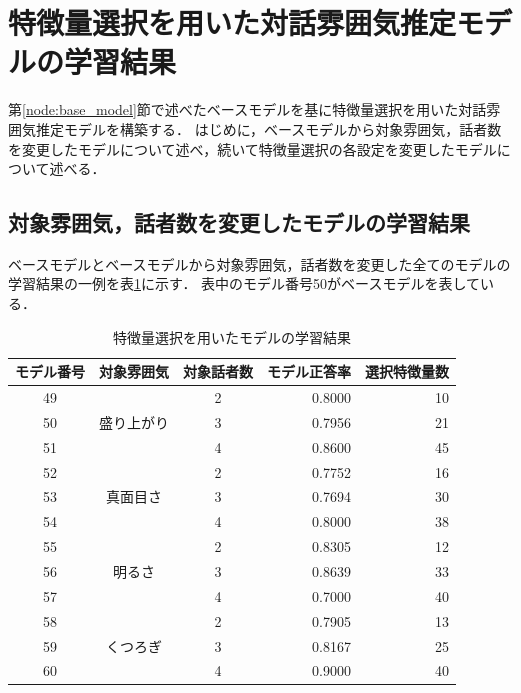 \section{特徴量選択を用いた対話雰囲気推定モデルの学習結果\label{node:learning_result_with_ga}}

第\ref{node:base_model}節で述べたベースモデルを基に特徴量選択を用いた対話雰囲気推定モデルを構築する．
はじめに，ベースモデルから対象雰囲気，話者数を変更したモデルについて述べ，続いて特徴量選択の各設定を変更したモデルについて述べる．

\subsection{対象雰囲気，話者数を変更したモデルの学習結果\label{item:learning_result_with_ga_change_targets}}

ベースモデルとベースモデルから対象雰囲気，話者数を変更した全てのモデルの学習結果の一例を表\ref{tab:learn_result_with_ga}に示す．
表中のモデル番号50がベースモデルを表している．

\begin{table}[t]
    \caption{特徴量選択を用いたモデルの学習結果}
    \centering
    \begin{tabular}{|c|c|c|r|r|}
        \hline
        モデル番号 & 対象雰囲気 & 対象話者数 & モデル正答率 & 選択特徴量数 \\
        \hline\hline
        49 & \multirow{3}{*}{盛り上がり} & 2 & 0.8000 & 10 \\ \cline{1-1}\cline{3-5}
        50 & & 3 & 0.7956 & 21 \\ \cline{1-1}\cline{3-5}
        51 & & 4 & 0.8600 & 45 \\ \hline
        52 & \multirow{3}{*}{真面目さ} & 2 & 0.7752 & 16 \\ \cline{1-1}\cline{3-5}
        53 & & 3 & 0.7694 & 30 \\ \cline{1-1}\cline{3-5}
        54 & & 4 & 0.8000 & 38 \\ \hline
        55 & \multirow{3}{*}{明るさ} & 2 & 0.8305 & 12 \\ \cline{1-1}\cline{3-5}
        56 & & 3 & 0.8639 & 33 \\ \cline{1-1}\cline{3-5}
        57 & & 4 & 0.7000 & 40 \\ \hline
        58 & \multirow{3}{*}{くつろぎ} & 2 & 0.7905 & 13 \\ \cline{1-1}\cline{3-5}
        59 & & 3 & 0.8167 & 25 \\ \cline{1-1}\cline{3-5}
        60 & & 4 & 0.9000 & 40 \\ \hline
    \end{tabular}
    \label{tab:learn_result_with_ga}
\end{table}

